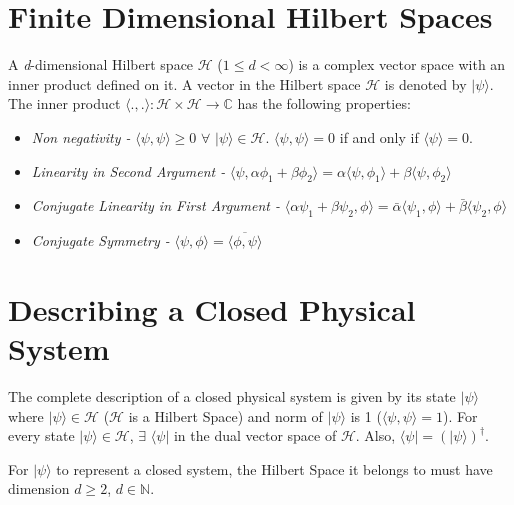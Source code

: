 \documentclass{article}
\begin{document}
    \section{Finite Dimensional Hilbert Spaces}
        A \textit{d}-dimensional Hilbert space $\mathcal{H}$ ($1 \leq d < \infty$) is a complex vector space with an inner product defined on it. A vector in the Hilbert space $\mathcal{H}$ is denoted by $|\psi\rangle $. The inner product $\langle . ,. \rangle : \mathcal{H} \times \mathcal{H} \rightarrow \mathbb{C} $ has the following properties:
        \begin{itemize}
            \item \textit{Non negativity -} $\langle \psi , \psi \rangle \geq 0$ $\forall$ $|\psi \rangle \in \mathcal{H}$. $\langle \psi , \psi \rangle = 0$ if and only if $\langle \psi \rangle= 0$.
            
            \item \textit{Linearity in Second Argument -} $\langle \psi , \alpha \phi_1 + \beta \phi_2 \rangle = \alpha \langle \psi , \phi_1 \rangle + \beta \langle \psi , \phi_2 \rangle $
            
            \item \textit{Conjugate Linearity in First Argument -} $\langle \alpha \psi_1 + \beta \psi_2 , \phi \rangle = \bar{\alpha} \langle \psi_1 , \phi \rangle + \bar{\beta} \langle \psi_2 , \phi \rangle$
            
            \item \textit{Conjugate Symmetry -} $\langle \psi , \phi \rangle = \overline{\langle \phi , \psi \rangle}$
        \end{itemize}
    
    \section{Describing a Closed Physical System}
        The complete description of a closed physical system is given by its state $ | \psi \rangle $ where $ | \psi \rangle \in \mathcal{H}$ ($\mathcal{H}$ is a Hilbert Space) and norm of $ | \psi \rangle $ is 1 ($\langle \psi , \psi \rangle = 1$).
        For every state $ | \psi \rangle \in \mathcal{H}$, $\exists$ $\langle \psi |$ in the dual vector space of $\mathcal{H}$. Also, $\langle \psi | = (| \psi \rangle)^{\dagger}$.

        For $| \psi \rangle$ to represent a closed system, the Hilbert Space it belongs to must have dimension $d \geq 2$, $d \in \mathbb{N}$.
\end{document}
